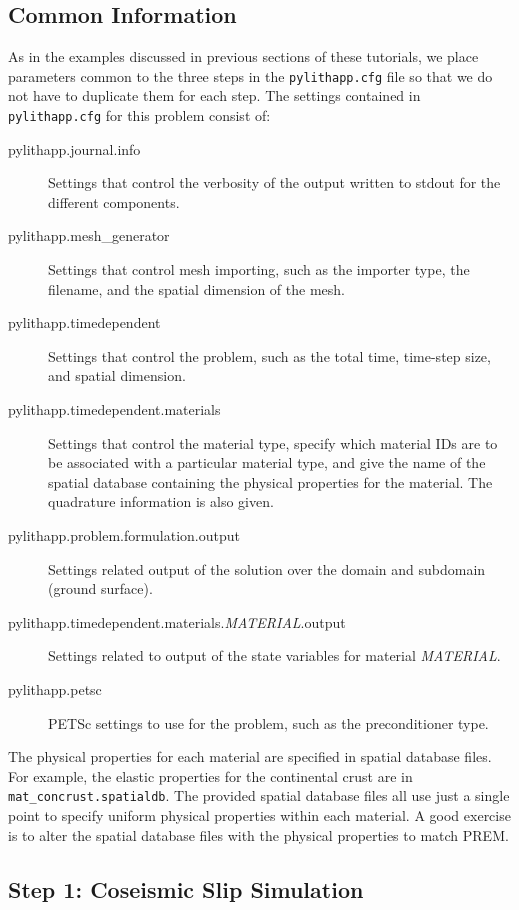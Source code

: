 \subsection{Common Information}

As in the examples discussed in previous sections of these tutorials,
we place parameters common to the three steps in the \texttt{pylithapp.cfg}
file so that we do not have to duplicate them for each step. The settings
contained in \texttt{pylithapp.cfg} for this problem consist of:
\begin{description}
\item [{pylithapp.journal.info}] Settings that control the verbosity of
the output written to stdout for the different components.
\item [{pylithapp.mesh\_generator}] Settings that control mesh importing,
such as the importer type, the filename, and the spatial dimension
of the mesh.
\item [{pylithapp.timedependent}] Settings that control the problem, such
as the total time, time-step size, and spatial dimension.
\item [{pylithapp.timedependent.materials}] Settings that control the material
type, specify which material IDs are to be associated with a particular
material type, and give the name of the spatial database containing
the physical properties for the material. The quadrature information
is also given.
\item [{pylithapp.problem.formulation.output}] Settings related output
of the solution over the domain and subdomain (ground surface).
\item [{pylithapp.timedependent.materials.\textit{MATERIAL}.output}] Settings
related to output of the state variables for material \textit{MATERIAL}.
\item [{pylithapp.petsc}] PETSc settings to use for the problem, such as
the preconditioner type.
\end{description}
The physical properties for each material are specified in spatial
database files. For example, the elastic properties for the continental
crust are in \texttt{mat\_concrust.spatialdb}. The provided spatial
database files all use just a single point to specify uniform physical
properties within each material. A good exercise is to alter the spatial
database files with the physical properties to match PREM.


\subsection{Step 1: Coseismic Slip Simulation}

